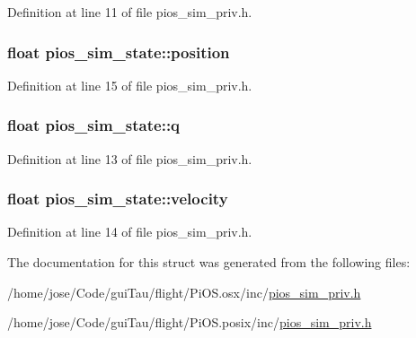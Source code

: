 Definition at line 11 of file pios\-\_\-sim\-\_\-priv.\-h.

\hypertarget{structpios__sim__state_a48c9b069fe73f0cfd18111e603fe126f}{
\subsubsection[{position}]{\setlength{\rightskip}{0pt plus 5cm}float pios\-\_\-sim\-\_\-state\-::position}}\label{structpios__sim__state_a48c9b069fe73f0cfd18111e603fe126f}


Definition at line 15 of file pios\-\_\-sim\-\_\-priv.\-h.

\hypertarget{structpios__sim__state_a45c228037b6d97d3a0b7fffd4972112b}{
\subsubsection[{q}]{\setlength{\rightskip}{0pt plus 5cm}float pios\-\_\-sim\-\_\-state\-::q}}\label{structpios__sim__state_a45c228037b6d97d3a0b7fffd4972112b}


Definition at line 13 of file pios\-\_\-sim\-\_\-priv.\-h.

\hypertarget{structpios__sim__state_a879a3a3ee4d606b373d919eb4e1ad458}{
\subsubsection[{velocity}]{\setlength{\rightskip}{0pt plus 5cm}float pios\-\_\-sim\-\_\-state\-::velocity}}\label{structpios__sim__state_a879a3a3ee4d606b373d919eb4e1ad458}


Definition at line 14 of file pios\-\_\-sim\-\_\-priv.\-h.



The documentation for this struct was generated from the following files\-:\begin{DoxyCompactItemize}
\item 
/home/jose/\-Code/gui\-Tau/flight/\-Pi\-O\-S.\-osx/inc/\hyperlink{_pi_o_s_8osx_2inc_2pios__sim__priv_8h}{pios\-\_\-sim\-\_\-priv.\-h}\item 
/home/jose/\-Code/gui\-Tau/flight/\-Pi\-O\-S.\-posix/inc/\hyperlink{_pi_o_s_8posix_2inc_2pios__sim__priv_8h}{pios\-\_\-sim\-\_\-priv.\-h}\end{DoxyCompactItemize}
